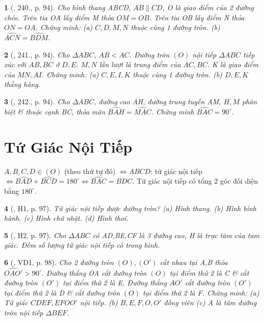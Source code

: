 \documentclass{article}
\newtheorem{baitoan}{}
\begin{document}
\begin{baitoan}[\cite{Binh_Toan_9_tap_2}, 240., p. 94]
	Cho hình thang ABCD, $AB\parallel CD$, O là giao điểm của 2 đường chéo. Trên tia OA lấy điểm M thỏa $OM = OB$. Trên tia OB lấy điểm N thỏa $ON = OA$. Chứng minh: (a) $C,D,M,N$ thuộc cùng 1 đường tròn. (b) $\widehat{ACN} = \widehat{BDM}$.
\end{baitoan}

\begin{baitoan}[\cite{Binh_Toan_9_tap_2}, 241., p. 94]
	Cho $\Delta ABC$, $AB < AC$. Đường tròn $(O)$ nội tiếp $\Delta ABC$ tiếp xúc với $AB,BC$ ở $D,E$. $M,N$ lần lượt là trung điểm của $AC,BC$. K là giao điểm của $MN,AI$. Chứng minh: (a) $C,E,I,K$ thuộc cùng 1 đường tròn. (b) $D,E,K$ thẳng hàng.
\end{baitoan}

\begin{baitoan}[\cite{Binh_Toan_9_tap_2}, 242., p. 94]
	Cho $\Delta ABC$, đường cao AH, đường trung tuyến AM, $H,M$ phân biệt \& thuộc cạnh BC, thỏa mãn $\widehat{BAH} = \widehat{MAC}$. Chứng minh $\widehat{BAC} = 90^\circ$.
\end{baitoan}


\section{Tứ Giác Nội Tiếp}
 $A,B,C,D\in(O)$ (theo thứ tự đó) $\Leftrightarrow ABCD$: tứ giác nội tiếp $\Leftrightarrow\widehat{BAD} + \widehat{BCD} = 180^\circ\Leftrightarrow\widehat{BAC} = \widehat{BDC}$.  Tứ giác nội tiếp có tổng 2 góc đối diện bằng $180^\circ$.

\begin{baitoan}[\cite{Binh_boi_duong_Toan_9_tap_2}, H1, p. 97]
	Tứ giác nội tiếp được đường tròn? (a) Hình thang. (b) Hình bình hành. (c) Hình chữ nhật. (d) Hình thoi.
\end{baitoan}

\begin{baitoan}[\cite{Binh_boi_duong_Toan_9_tap_2}, H2, p. 97]
	Cho $\Delta ABC$ có AD,BE,CF là 3 đường cao, H là trực tâm của tam giác. Đếm số lượng tứ giác nội tiếp có trong hình.
\end{baitoan}

\begin{baitoan}[\cite{Binh_boi_duong_Toan_9_tap_2}, VD1, p. 98]
	Cho 2 đường tròn $(O),(O')$ cắt nhau tại A,B thỏa $\widehat{OAO'} > 90^\circ$. Đường thẳng OA cắt đường tròn $(O)$ tại điểm thứ 2 là C \& cắt đường tròn $(O')$ tại điểm thứ 2 là E. Đường thẳng $AO'$ cắt đường tròn $(O')$ tại điểm thứ 2 là D \& cắt đường tròn $(O)$ tại điểm thứ 2 là F. Chứng minh: (a) Tứ giác $CDEF,EFOO'$ nội tiếp. (b) $B,E,F,O,O'$ đồng viên (c) A là tâm đường tròn nội tiếp $\Delta BEF$.
\end{baitoan}
\end{document}
